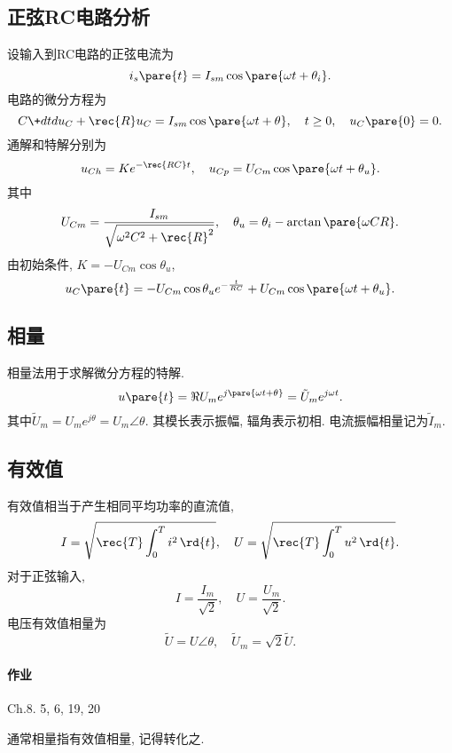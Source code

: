 \documentclass{ctexart}
\begin{document}

\subsection{正弦RC电路分析} %
\label{sub:正弦rc电路分析}

设输入到RC电路的正弦电流为
\[ i_s\pare{t} = I_{sm}\cos\pare{\omega t + \theta_i}. \]
电路的微分方程为
\[ C\+dtd{u_C} + \rec{R}u_C = I_{sm}\cos\pare{\omega t + \theta},\quad t\ge 0,\quad u_C\pare{0} = 0. \]
通解和特解分别为
\[ u_{Ch} = Ke^{-\rec{RC}t},\quad u_{Cp} = U_{Cm}\cos \pare{\omega t + \theta_u}. \]
其中
\[ U_{Cm} = \frac{I_{sm}}{\sqrt{\omega^2 C^2 + \rec{R}^2}},\quad \theta_u = \theta_i - \arctan \pare{\omega CR}. \]
由初始条件, $K = -U_{Cm}\cos\theta_u$,
\[ u_C\pare{t} = -U_{Cm}\cos\theta_u e^{-\frac{t}{RC}} + U_{Cm}\cos\pare{\omega t + \theta_u}. \]


\subsection{相量} %
\label{sub:相量}

相量法用于求解微分方程的特解.
\[ u\pare{t} = \Re U_m e^{j\pare{\omega t + \theta}} = \tilde{U}_m e^{j\omega t}. \]
其中$\tilde{U}_m = U_m e^{j\theta} = U_m \angle \theta$. 其模长表示振幅, 辐角表示初相. 电流振幅相量记为$\tilde{I}_m$.


\subsection{有效值} %
\label{sub:有效值}

有效值相当于产生相同平均功率的直流值,
\[ I = \sqrt{\rec{T}\int_0^T i^2\,\rd{t}},\quad U = \sqrt{\rec{T}\int_0^T u^2\,\rd{t}}. \]
对于正弦输入,
\[ I = \frac{I_m}{\sqrt{2}},\quad U = \frac{U_m}{\sqrt{2}}. \]
电压有效值相量为
\[ \tilde{U} = U\angle\theta,\quad \tilde{U}_m = \sqrt{2}\tilde{U}. \]

\paragraph{作业} %
\label{par:作业}

Ch.8. 5, 6, 19, 20


\begin{pitfall}
    通常相量指有效值相量, 记得转化之.
\end{pitfall}
\end{document}
